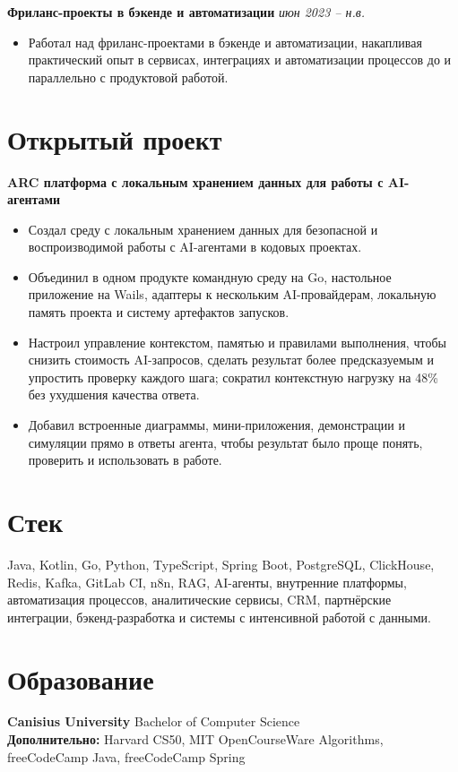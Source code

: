 \documentclass[10pt,a4paper]{article}
\begin{document}
\textbf{Фриланс-проекты в бэкенде и автоматизации} \hfill \textit{июн 2023 -- н.в.}
\begin{itemize}
  \item Работал над фриланс-проектами в бэкенде и автоматизации, накапливая практический опыт в сервисах, интеграциях и автоматизации процессов до и параллельно с продуктовой работой.
\end{itemize}

\section*{Открытый проект}

\textbf{ARC \textbar{} платформа с локальным хранением данных для работы с AI-агентами}
\begin{itemize}
  \item Создал среду с локальным хранением данных для безопасной и воспроизводимой работы с AI-агентами в кодовых проектах.
  \item Объединил в одном продукте командную среду на Go, настольное приложение на Wails, адаптеры к нескольким AI-провайдерам, локальную память проекта и систему артефактов запусков.
  \item Настроил управление контекстом, памятью и правилами выполнения, чтобы снизить стоимость AI-запросов, сделать результат более предсказуемым и упростить проверку каждого шага; сократил контекстную нагрузку на 48\% без ухудшения качества ответа.
  \item Добавил встроенные диаграммы, мини-приложения, демонстрации и симуляции прямо в ответы агента, чтобы результат было проще понять, проверить и использовать в работе.
\end{itemize}

\section*{Стек}
Java, Kotlin, Go, Python, TypeScript, Spring Boot, PostgreSQL, ClickHouse, Redis, Kafka, GitLab CI, n8n, RAG, AI-агенты, внутренние платформы, автоматизация процессов, аналитические сервисы, CRM, партнёрские интеграции, бэкенд-разработка и системы с интенсивной работой с данными.

\section*{Образование}
\textbf{Canisius University} \textbar{} Bachelor of Computer Science\\
\textbf{Дополнительно:} Harvard CS50, MIT OpenCourseWare Algorithms, freeCodeCamp Java, freeCodeCamp Spring
\end{document}
